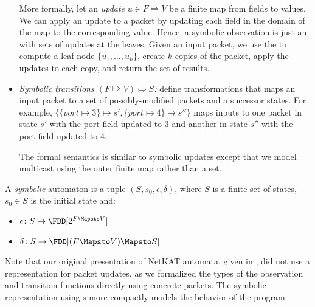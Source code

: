 \begin{itemize}
  More formally, let an \emph{update} $u \in F \Mapsto V$ be a finite
  map from fields to values. We can apply an update to a packet by
  updating each field in the domain of the map to the corresponding
  value. Hence, a symbolic observation is just an \FDD with sets of
  updates at the leaves. Given an input packet, we use the \FDD to
  compute a leaf node $\{u_1,\dots,u_k\}$, create $k$ copies of the
  packet, apply the updates to each copy, and return the set of
  results.
\item{\emph{Symbolic transitions $(F \Mapsto V) \Mapsto S$:}} define
  transformations that maps an input packet to a set of
  possibly-modified packets and a successor states. For example, $\{
  \{ \mathit{port} \mapsto 3 \} \mapsto s', \{ \mathit{port} \mapsto 4
  \} \mapsto s'' \}$ maps inputs to one packet in state $s'$ with the
  port field updated to $3$ and another in state $s''$ with the port
  field updated to $4$.

  The formal semantics is similar to symbolic updates except that we
  model multicast using the outer finite map rather than a set.
\end{itemize}

A {\em symbolic} \NetKAT automaton is a tuple $(S, s_0, \epsilon,
\delta)$, where $S$ is a finite set of states, $s_0\in S$ is the
initial state and:
\begin{itemize}
    \item $\epsilon\colon S \to \FDD[2^{F\Mapsto V}]$
    \item $\delta\colon S \to \FDD[(F \Mapsto V) \Mapsto S]$
\end{itemize}

Note that our original presentation of NetKAT automata, given in
, did not use a representation for packet updates,
as we formalized the types of the observation and transition functions
directly using concrete packets. The symbolic representation using
\FDD s more compactly models the behavior of the program.

